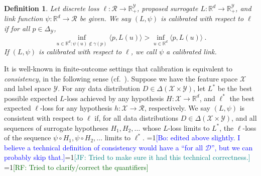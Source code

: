 \documentclass[11pt]{article}
\newcommand{\Comments}{1}
\newcommand{\mynote}[2]{\ifnum\Comments=1\textcolor{#1}{#2}\fi}
\newcommand{\raf}[1]{\mynote{darkgreen}{[RF: #1]}}
\newcommand{\jessie}[1]{\mynote{teal}{[JF: #1]}}
\newcommand{\bo}[1]{\mynote{blue}{[Bo: #1]}}
\newcommand{\reals}{\mathbb{R}}
\newcommand{\simplex}{\Delta_\Y}
\newcommand{\D}{\mathcal{D}}
\newcommand{\R}{\mathcal{R}}
\newcommand{\X}{\mathcal{X}}
\newcommand{\Y}{\mathcal{Y}}
\newcommand{\inprod}[2]{\langle #1, #2 \rangle}%
\newtheorem{definition}{Definition}
\begin{document}

\begin{definition}
  \label{def:calibrated}
  Let discrete loss $\ell:\R\to\reals^\Y_+$, proposed surrogate $L:\reals^d\to\reals^\Y_+$, and link function $\psi:\reals^d\to\R$ be given.
  We say $(L,\psi)$ is \emph{calibrated} with respect to $\ell$ if
for all $p \in \simplex$,
  \begin{equation}
    \label{eq:calibrated}
  \inf_{u \in \reals^d : \psi(u) \not\in \gamma(p)} \inprod{p}{L(u)} > \inf_{u \in \reals^d} \inprod{p}{L(u)}~.
  \end{equation}
  If $(L, \psi)$ is calibrated with respect to $\ell$, we call $\psi$ a \emph{calibrated link.}
\end{definition}
It is well-known in finite-outcome settings that calibration is equivalent to \emph{consistency}, in the following sense (cf.~\citep{bartlett2006convexity,zhang2004statistical,agarwal2015consistent}).
Suppose we have the feature space $\X$ and label space $\Y$.
For any data distribution $D \in \Delta(\X \times \Y)$, let $L^*$ be the best possible expected $L$-loss achieved by any hypothesis $H:\X\to\reals^d$, and $\ell^*$ the best expected $\ell$-loss for any hypothesis $h:\X\to\R$, respectively.
We say $(L,\psi)$ is consistent with respect to $\ell$ if, for all data distributions $D \in \Delta(\X \times \Y)$, and all sequences of surrogate hypotheses $H_1,H_2,\ldots$ whose $L$-loss limits to $L^*$, the $\ell$-loss of the sequence $\psi\circ H_1,\psi \circ H_2, \ldots$ limits to $\ell^*$.
\bo{edited above slightly. I believe a technical definition of consistency would have a ``for all $\D$'', but we can probably skip that.}\jessie{Tried to make sure it had this technical correctness.}
\raf{Tried to clarify/correct the quantifiers}
\end{document}

